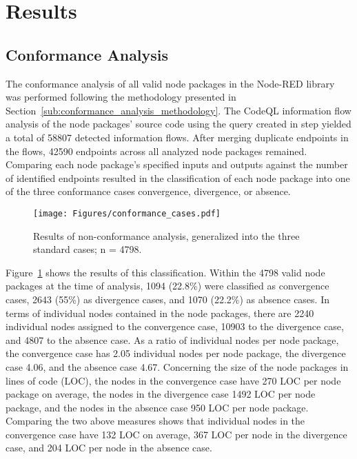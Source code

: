 \section{Results}
\label{sec:results}



\subsection{Conformance Analysis}
\label{sub:conformance_analysis_results}

The conformance analysis of all valid node packages in the Node-RED library was performed following the methodology presented in Section~\ref{sub:conformance_analysis_methodology}.
The CodeQL information flow analysis of the node packages' source code using the query created in step {\textbf{}} yielded a total of 58807 detected information flows. 
After merging duplicate endpoints in the flows, 42590 endpoints across all analyzed node packages remained.
Comparing each node package's specified inputs and outputs against the number of identified endpoints resulted in the classification of each node package into one of the three conformance cases convergence, divergence, or absence.
%
\begin{figure}
    \centering
    \texttt{[image: Figures/conformance\_cases.pdf]}
    \caption{Results of non-conformance analysis, generalized into the three standard cases; n = 4798.}
    \label{fig:non_conformances_generalized}
\end{figure}
%
Figure~\ref{fig:non_conformances_generalized} shows the results of this classification.
Within the 4798 valid node packages at the time of analysis, 1094 (22.8\%) were classified as convergence cases, 2643 (55\%) as divergence cases, and 1070 (22.2\%) as absence cases. 
In terms of individual nodes contained in the node packages, there are 2240 individual nodes assigned to the convergence case, 10903 to the divergence case, and 4807 to the absence case.
As a ratio of individual nodes per node package, the convergence case has 2.05 individual nodes per node package, the divergence case 4.06, and the absence case 4.67.
Concerning the size of the node packages in lines of code (LOC), the nodes in the convergence case have 270 LOC per node package on average, the nodes in the divergence case 1492 LOC per node package, and the nodes in the absence case 950 LOC per node package.
Comparing the two above measures shows that individual nodes in the convergence case have 132 LOC on average, 367 LOC per node in the divergence case, and 204 LOC per node in the absence case.

